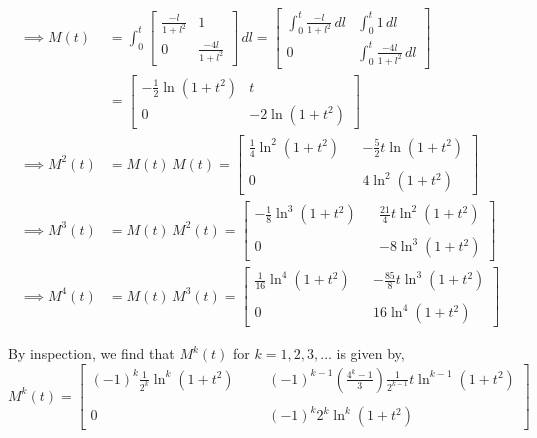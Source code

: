 \begin{align*}
    \implies
    M(t)
        & =
    \int_{0}^{t}
    \begin{bmatrix}
        \frac{-l}{1+l^2} & 1                 \\
        0                & \frac{-4l}{1+l^2}
    \end{bmatrix}
    \, dl
    =
    \begin{bmatrix}
        \int_{0}^{t} \frac{-l}{1+l^2} \, dl
        &
        \int_{0}^{t} 1 \, dl
        \\
        0
        &
        \int_{0}^{t} \frac{-4l}{1+l^2} \, dl
    \end{bmatrix}
    \\ & =
    \begin{bmatrix}
        -\frac{1}{2} \ln(1+t^2)
        &
        t
        \\
        0
        &
        -2 \ln(1+t^2)
    \end{bmatrix}
    \\
    \implies
    M^2(t)
    & =
    M(t) \, M(t)
    =
    \begin{bmatrix}
        \frac{1}{4} \ln^2(1+t^2)
        & &
        -\frac{5}{2} t \ln(1+t^2)
        \\ \\
        0
        & &
        4 \ln^2(1+t^2)
    \end{bmatrix}
    \\
    \implies
    M^3(t)
    & =
    M(t) \, M^2(t)
    =
    \begin{bmatrix}
        -\frac{1}{8} \ln^3(1+t^2)
        & &
        \frac{21}{4} t \ln^2(1+t^2)
        \\ \\
        0
        & &
        -8 \ln^3(1+t^2)
    \end{bmatrix}
    \\
    \implies
    M^4(t)
    & =
    M(t) \, M^3(t)
    =
    \begin{bmatrix}
        \frac{1}{16} \ln^4(1+t^2)
        & &
        -\frac{85}{8} t \ln^3(1+t^2)
        \\ \\
        0
        & &
        16 \ln^4(1+t^2)
    \end{bmatrix}
\end{align*}

By inspection, we find that \( M^{k} (t) \) for \( k = 1, 2, 3, \ldots \) is given by,
\begin{equation*}
    M^{k} (t)
    =
    \begin{bmatrix}
        \displaystyle
        {(-1)}^{k} \frac{1}{2^k} \ln^{k}(1+t^2)
        & & &
        \displaystyle
        {(-1)}^{k-1} \left( \frac{4^k-1}{3} \right) \frac{1}{2^{k-1}} t \ln^{k-1}(1+t^2)
        \\ \\
        0
        & & &
        \displaystyle
        {(-1)}^{k} 2^{k} \ln^{k}(1+t^2)
    \end{bmatrix}
\end{equation*}

